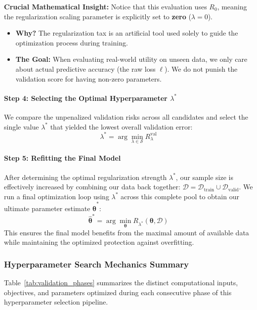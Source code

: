 \documentclass{article}
\begin{document}
\textbf{Crucial Mathematical Insight:} Notice that this evaluation uses $R_0$, meaning the regularization scaling parameter is explicitly set to \textbf{zero} ($\lambda = 0$). 
\begin{itemize}
    \item \textbf{Why?} The regularization tax is an artificial tool used solely to guide the optimization process during training. 
    \item \textbf{The Goal:} When evaluating real-world utility on unseen data, we only care about actual predictive accuracy (the raw loss $\ell$). We do not punish the validation score for having non-zero parameters.
\end{itemize}

\paragraph{Step 4: Selecting the Optimal Hyperparameter $\lambda^*$}
We compare the unpenalized validation risks across all candidates and select the single value $\lambda^*$ that yielded the lowest overall validation error:
\begin{equation}
\lambda^* = \arg\min_{\lambda \in \mathcal{S}} R^{\text{val}}_\lambda
\end{equation}

\paragraph{Step 5: Refitting the Final Model}
After determining the optimal regularization strength $\lambda^*$, our sample size is effectively increased by combining our data back together: $\mathcal{D} = \mathcal{D}_{\text{train}} \cup \mathcal{D}_{\text{valid}}$. We run a final optimization loop using $\lambda^*$ across this complete pool to obtain our ultimate parameter estimate $\hat{\boldsymbol{\theta}}^*$:
\begin{equation}
\hat{\boldsymbol{\theta}}^* = \arg\min_{\boldsymbol{\theta}} R_{\lambda^*}(\boldsymbol{\theta}, \mathcal{D})
\end{equation}
This ensures the final model benefits from the maximal amount of available data while maintaining the optimized protection against overfitting.

\subsubsection{Hyperparameter Search Mechanics Summary}
Table~\ref{tab:validation_phases} summarizes the distinct computational inputs, objectives, and parameters optimized during each consecutive phase of this hyperparameter selection pipeline.
\end{document}

